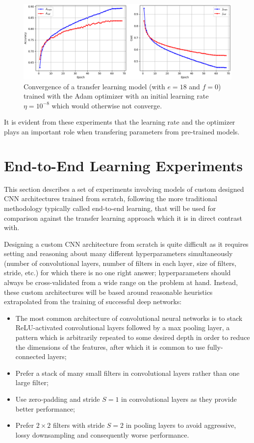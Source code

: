 \begin{figure}[ht]
    \centering
    \includegraphics[width=1.0\textwidth]{figs/vgg16_adam.png}
    \caption{Convergence of a transfer learning model (with $e = 18$ and $f = 0$) trained with the Adam optimizer with an initial learning rate $\eta = 10^{-8}$ which would otherwise not converge.}
    \label{fig:vgg16_adam}
\end{figure}

It is evident from these experiments that the learning rate and the optimizer plays an important role when transfering parameters from pre-trained models.

\section{End-to-End Learning Experiments}

This section describes a set of experiments involving models of custom designed \ac{CNN} architectures trained from scratch, following the more traditional methodology typically called end-to-end learning, that will be used for comparison against the transfer learning approach which it is in direct contrast with.

Designing a custom \ac{CNN} architecture from scratch is quite difficult as it requires setting and reasoning about many different hyperparameters simultaneously (number of convolutional layers, number of filters in each layer, size of filters, stride, etc.) for which there is no one right answer; hyperparameters should always be cross-validated from a wide range on the problem at hand. Instead, these custom architectures will be based around reasonable heuristics \cite{cs231n} extrapolated from the training of successful deep networks:

\begin{itemize}
    \item The most common architecture of convolutional neural networks is to stack ReLU-activated convolutional layers followed by a max pooling layer, a pattern which is arbitrarily repeated to some desired depth in order to reduce the dimensions of the features, after which it is common to use fully-connected layers;
    \item Prefer a stack of many small filters in convolutional layers rather than one large filter;
    \item Use zero-padding and stride $S = 1$ in convolutional layers as they provide better performance;
    \item Prefer $2 \times 2$ filters with stride $S = 2$ in pooling layers to avoid aggressive, lossy downsampling and consequently worse performance.
\end{itemize}

